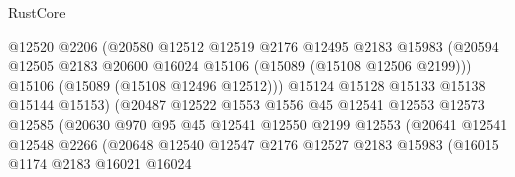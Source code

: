 \begin{lexlean}{RustCore}
\begin{coremodule}
                                    @12520
                                    @2206
                                    (@20580
                                      @12512
                                      @12519
                                      @2176
                                      @12495
                                      @2183
                                      @15983
                                      (@20594
                                        @12505
                                        @2183
                                        @20600
                                        @16024
                                        @15106
                                        (@15089 (@15108 @12506 @2199)))
                                      @15106
                                      (@15089 (@15108 @12496 @12512)))
                                    @15124
                                    @15128
                                    @15133
                                    @15138
                                    @15144
                                    @15153)
                                  (@20487
                                    @12522
                                    @1553
                                    @1556
                                    @45
                                    @12541
                                    @12553
                                    @12573
                                    @12585
                                    (@20630
                                      @970
                                      @95
                                      @45
                                      @12541
                                      @12550
                                      @2199
                                      @12553
                                      (@20641
                                        @12541
                                        @12548
                                        @2266
                                        (@20648
                                          @12540
                                          @12547
                                          @2176
                                          @12527
                                          @2183
                                          @15983
                                          (@16015
                                            @1174
                                            @2183
                                            @16021
                                            @16024

\end{coremodule}
\end{lexlean}
